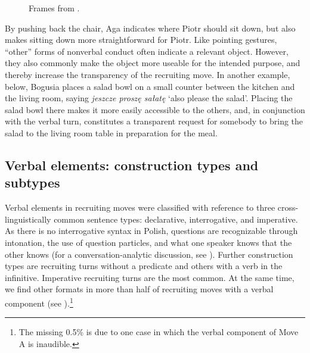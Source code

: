 \documentclass[output=paper]{langsci/langscibook}
\begin{document}
\begin{figure}
\caption{Frames from .}
\label{fig:zinken:2}
\end{figure}

% 

By pushing back the chair, Aga indicates where Piotr should sit down, but also makes sitting down more straightforward for Piotr. Like pointing gestures, ``other'' forms of nonverbal conduct often indicate a relevant object. However, they also commonly make the object more useable for the intended purpose, and thereby increase the transparency of the recruiting move.  In another example,  below, Bogusia places a salad bowl on a small counter between the kitchen and the living room, saying \textit{jeszcze proszę sałatę} ‘also please the salad’.  Placing the salad bowl there makes it more easily accessible to the others, and, in conjunction with the verbal turn, constitutes a transparent request for somebody to bring the salad to the living room table in preparation for the meal.

\subsection{Verbal elements: construction types and subtypes}\label{sec:zinken:3.3}

Verbal elements in recruiting moves were classified with reference to three cross-linguistically common sentence types: declarative, interrogative, and imperative.  As there is no interrogative syntax in Polish, questions are recognizable through intonation, the use of question particles, and what one speaker knows that the other knows (for a conversation-analytic discussion, see \citealt{Weidner2013a}). Further construction types are recruiting turns without a predicate and others with a verb in the infinitive. Imperative recruiting turns are the most common. At the same time, we find other formats in more than half of recruiting moves with a verbal component (see ).\footnote{The missing 0.5\% is due to one case in which the verbal component of Move A is inaudible.}
\end{document}
